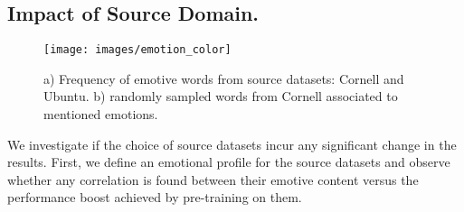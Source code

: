 \documentclass[preprint,3pt]{elsarticle}
\begin{document}
\begin{table}[h]
	\centering
	\caption{\footnotesize{Table to analyze HRED encoder vs BERT. Metric: Weighted-Fscore averaged over 10 random runs. BE = Best Epoch (average). }}
	\label{tab:glove_vs_bert}
\end{table}









\subsection{Impact of Source Domain.}

\begin{figure}[h]
    \centering
	\texttt{[image: images/emotion\_color]}
	\caption{a) Frequency of emotive words from source datasets: Cornell and Ubuntu. b) randomly sampled words from Cornell associated to mentioned emotions.}
	\label{fig:emotion_color}
\end{figure}

We investigate if the choice of source datasets incur any significant change in the results. First, we define an emotional profile for the source datasets and observe whether any correlation is found between their emotive content versus the performance boost achieved by pre-training on them.
\end{document}
